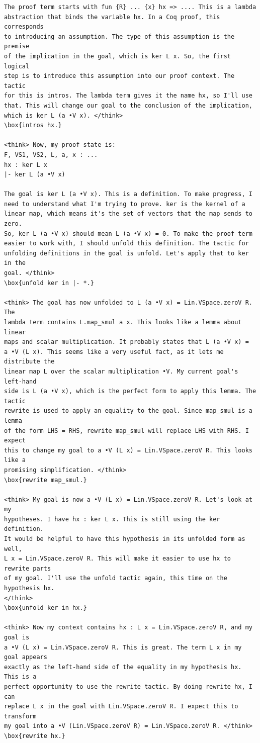 \documentclass{article}
\begin{document}
\begin{verbatim}
The proof term starts with fun {R} ... {x} hx => .... This is a lambda
abstraction that binds the variable hx. In a Coq proof, this corresponds
to introducing an assumption. The type of this assumption is the premise
of the implication in the goal, which is ker L x. So, the first logical
step is to introduce this assumption into our proof context. The tactic
for this is intros. The lambda term gives it the name hx, so I'll use
that. This will change our goal to the conclusion of the implication,
which is ker L (a •V x). </think>
\box{intros hx.}

<think> Now, my proof state is:
F, VS1, VS2, L, a, x : ...
hx : ker L x
|- ker L (a •V x)

The goal is ker L (a •V x). This is a definition. To make progress, I
need to understand what I'm trying to prove. ker is the kernel of a
linear map, which means it's the set of vectors that the map sends to zero.
So, ker L (a •V x) should mean L (a •V x) = 0. To make the proof term
easier to work with, I should unfold this definition. The tactic for
unfolding definitions in the goal is unfold. Let's apply that to ker in the
goal. </think>
\box{unfold ker in |- *.}

<think> The goal has now unfolded to L (a •V x) = Lin.VSpace.zeroV R. The
lambda term contains L.map_smul a x. This looks like a lemma about linear
maps and scalar multiplication. It probably states that L (a •V x) =
a •V (L x). This seems like a very useful fact, as it lets me distribute the
linear map L over the scalar multiplication •V. My current goal's left-hand
side is L (a •V x), which is the perfect form to apply this lemma. The tactic
rewrite is used to apply an equality to the goal. Since map_smul is a lemma
of the form LHS = RHS, rewrite map_smul will replace LHS with RHS. I expect
this to change my goal to a •V (L x) = Lin.VSpace.zeroV R. This looks like a
promising simplification. </think>
\box{rewrite map_smul.}

<think> My goal is now a •V (L x) = Lin.VSpace.zeroV R. Let's look at my
hypotheses. I have hx : ker L x. This is still using the ker definition.
It would be helpful to have this hypothesis in its unfolded form as well,
L x = Lin.VSpace.zeroV R. This will make it easier to use hx to rewrite parts
of my goal. I'll use the unfold tactic again, this time on the hypothesis hx.
</think>
\box{unfold ker in hx.}

<think> Now my context contains hx : L x = Lin.VSpace.zeroV R, and my goal is
a •V (L x) = Lin.VSpace.zeroV R. This is great. The term L x in my goal appears
exactly as the left-hand side of the equality in my hypothesis hx. This is a
perfect opportunity to use the rewrite tactic. By doing rewrite hx, I can
replace L x in the goal with Lin.VSpace.zeroV R. I expect this to transform
my goal into a •V (Lin.VSpace.zeroV R) = Lin.VSpace.zeroV R. </think>
\box{rewrite hx.}


\end{verbatim}
\end{document}
